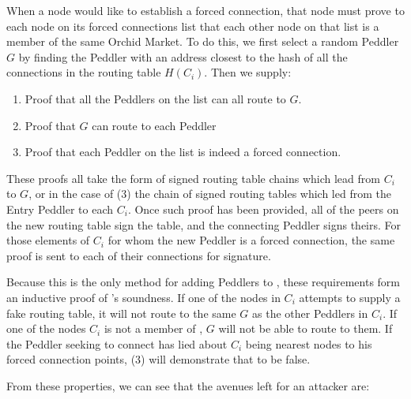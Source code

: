 When a node would like to establish a forced connection, that node must prove to each node on its forced connections list that each other node on that list is a member of the same Orchid Market. To do this, we first select a random Peddler $G$ by finding the Peddler with an address closest to the hash of all the connections in the routing table $H(C_i)$. Then we supply:

\begin{enumerate}
\item Proof that all the Peddlers on the list can all route to $G$.
\item Proof that $G$ can route to each Peddler
\item Proof that each Peddler on the list is indeed a forced connection.
\end{enumerate}

These proofs all take the form of signed routing table chains which lead from $C_i$ to $G$, or in the case of (3) the chain of signed routing tables which led from the Entry Peddler to each $C_i$. Once such proof has been provided, all of the peers on the new routing table sign the table, and the connecting Peddler signs theirs. For those elements of $C_i$ for whom the new Peddler is a forced connection, the same proof is sent to each of their connections for signature.

Because this is the only method for adding Peddlers to \tOM{}, these requirements form an inductive proof of \tOM{}'s soundness. If one of the nodes in $C_i$ attempts to supply a fake routing table, it will not route to the same $G$ as the other Peddlers in $C_i$. If one of the nodes $C_i$ is not a member of \tOM{}, $G$ will not be able to route to them. If the Peddler seeking to connect has lied about $C_i$ being nearest nodes to his forced connection points, (3) will demonstrate that to be false.

From these properties, we can see that the avenues left for an attacker are:


